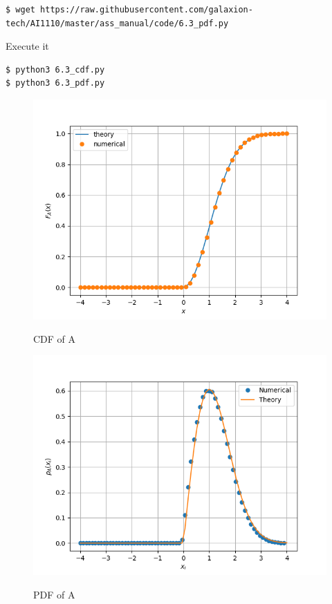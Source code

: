 \documentclass[journal,12pt,twocolumn]{IEEEtran}
\renewcommand\thesection{\arabic{section}}
\begin{document}
\begin{enumerate}[label=\thesection.\arabic*.,ref=\thesection.\theenumi]
\begin{lstlisting}
$ wget https://raw.githubusercontent.com/galaxion-tech/AI1110/master/ass_manual/code/6.3_pdf.py
\end{lstlisting}
Execute it 
\begin{lstlisting}
$ python3 6.3_cdf.py
$ python3 6.3_pdf.py
\end{lstlisting}
\begin{figure}[H]
    \includegraphics[scale = 0.6]{./figs/6.3_cdf.png}
    \label{6.3_cdf}
    \caption{CDF of A}
\end{figure}
\begin{figure}[H]
    \includegraphics[scale = 0.6]{./figs/6.3_pdf.png}
    \label{6.3_pdf}
    \caption{PDF of A}
\end{figure}

\end{enumerate}
\end{document}
